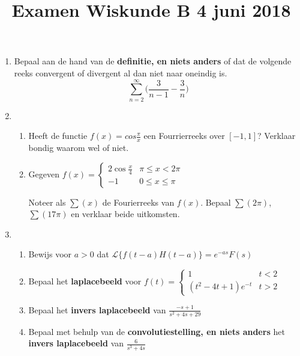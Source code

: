 \documentclass{article}
\begin{document}
\title{Examen Wiskunde B 4 juni 2018}

\date{}
\author{}
\maketitle

\begin{enumerate}

 \item  {
            Bepaal aan de hand van de \textbf{definitie, en niets anders} of dat de volgende reeks convergent of divergent al dan niet naar oneindig is. 
            $$\sum_{n = 2}^{\infty} \bigg(\frac{3}{n - 1} - \frac{3}{n}\bigg)$$
        }
        
 \item  {
            \begin{enumerate}
                \item Heeft de functie $f(x) = cos \frac{\pi}{x}$ een Fourrierreeks over $[-1, 1]$? Verklaar bondig waarom wel of niet.
                \item Gegeven $f(x) = \begin{cases}
                             2\cos \frac{x}{4}  & \pi \leq x < 2\pi \\
                             -1                 & 0 \leq x \leq \pi
                            \end{cases}$
                   
                   
                   Noteer als $\sum(x)$ de Fourierreeks van $f(x)$. Bepaal $\sum(2\pi)$, $\sum(17\pi)$ en verklaar beide uitkomsten.
            \end{enumerate}
        }
        
 \item \begin{enumerate}
        \item Bewijs voor $a > 0$ dat $\mathcal{L}\{f(t - a)H(t - a)\} = e^{-as}F(s)$
        \item Bepaal het \textbf{laplacebeeld} voor $f(t) =  \begin{cases}
                                                        1 & t < 2 \\
                                                        (t^2 - 4t + 1)e^{-t} & t > 2
                                                    \end{cases}$
        \item Bepaal het \textbf{invers laplacebeeld} van $\displaystyle\frac{-s + 1}{s^2 + 4s + 29}$ 
        \item Bepaal met behulp van de \textbf{convolutiestelling, en niets anders} het \textbf{invers laplacebeeld} van $\displaystyle \frac{6}{s^3 + 4s}$
       \end{enumerate}


\end{enumerate}
\end{document}
